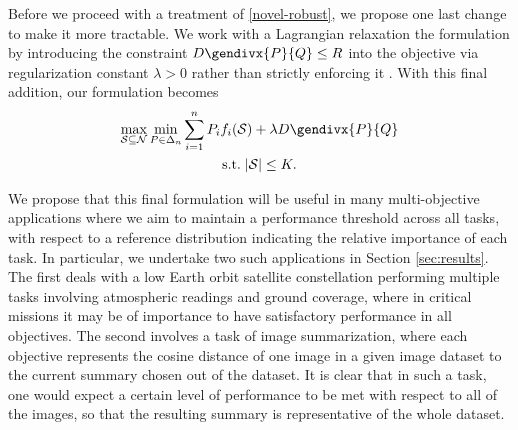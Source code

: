 \documentclass[letter,11pt]{article}
\newcommand{\infdiv}{D_{\text{KL}}\infdivx}
\newcommand{\gendiv}{D\gendivx}
\def\lp{\left(}
\def\rp{\right)}
\def\sS{\mathcal{S}}
\def\sN{\mathcal{N}}
\begin{document}
Before we proceed with a treatment of \eqref{novel-robust}, we propose one last change to make it more tractable. We work with a Lagrangian relaxation the formulation by introducing the constraint $\gendiv{P}{Q} \leq R$ into the objective via regularization constant $\lambda > 0$ rather than strictly enforcing it \cite{Boyd}. With this final addition, our formulation becomes
\begin{equation}\label{novel-final}
\begin{gathered}
\max_{\sS \subseteq \sN} \min_{P \in \Delta_n} \sum^n_{i=1} P_i f_i(\sS) + \lambda\gendiv{P}{Q}\\
\text{s.t.}\; \lvert \sS\rvert \leq K.
\end{gathered}
\end{equation}

We propose that this final formulation will be useful in many multi-objective applications where we aim to maintain a performance threshold across all tasks, with respect to a reference distribution indicating the relative importance of each task. In particular, we undertake two such applications in Section \ref{sec:results}. The first deals with a low Earth orbit satellite constellation performing multiple tasks involving atmospheric readings and ground coverage, where in critical missions it may be of importance to have satisfactory performance in all objectives. 
The second involves a task of image summarization, where each objective represents the cosine distance of one image in a given image dataset to the current summary chosen out of the dataset. It is clear that in such a task, one would expect a certain level of performance to be met with respect to all of the images, so that the resulting summary is representative of the whole dataset.
\end{document}
